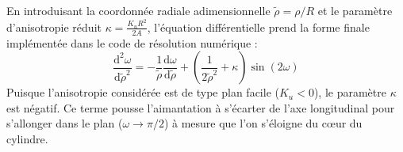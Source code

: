 \documentclass[11pt,a4paper]{article}
\begin{document}
En introduisant la coordonnée radiale adimensionnelle $\tilde{\rho} = \rho/R$ et le paramètre d'anisotropie réduit $\kappa = \frac{K_u R^2}{2A}$, l'équation différentielle prend la forme finale implémentée dans le code de résolution numérique :
\begin{equation}
    \frac{\text{d}^2\omega}{\text{d}\tilde{\rho}^2} = -\frac{1}{\tilde{\rho}}\frac{\text{d}\omega}{\text{d}\tilde{\rho}} + \left(\frac{1}{2\tilde{\rho}^2} + \kappa\right)\sin(2\omega)
\end{equation}
Puisque l'anisotropie considérée est de type plan facile ($K_u < 0$), le paramètre $\kappa$ est négatif. Ce terme pousse l'aimantation à s'écarter de l'axe longitudinal pour s'allonger dans le plan ($\omega \to \pi/2$) à mesure que l'on s'éloigne du cœur du cylindre.
\end{document}
